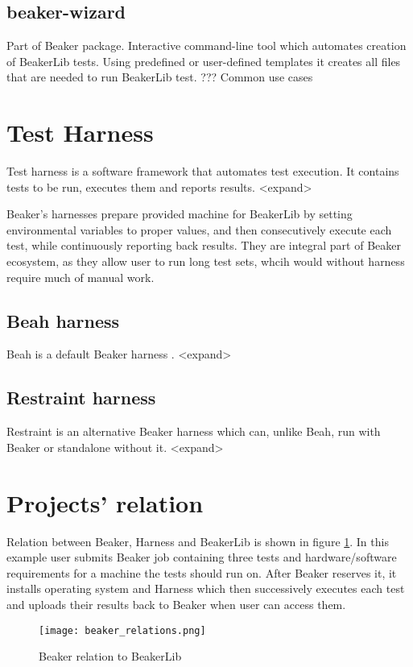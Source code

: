 \subsection{beaker-wizard}
Part of Beaker package. Interactive command-line tool which automates creation of BeakerLib tests. Using predefined or user-defined templates it creates all files that are needed to run BeakerLib test. 
???  Common use cases

\section{Test Harness}
Test harness is a software framework that automates test execution. It contains tests to be run, executes them and reports results. <expand>

Beaker’s harnesses prepare provided machine for BeakerLib by setting environmental variables to proper values, and then consecutively execute each test, while continuously reporting back results. They are integral part of Beaker ecosystem, as they allow user to run long test sets, whcih would without harness require much of manual work.

\subsection{Beah harness}
Beah \cite{beah_doc} is a default Beaker harness . <expand> 

\subsection{Restraint harness}
Restraint \cite{restraint_doc} is an alternative Beaker harness which can, unlike Beah, run with Beaker or standalone without it. <expand>

\section{Projects' relation}
Relation between Beaker, Harness and BeakerLib is shown in figure \ref{fig:beaker_relation}. In this example user submits Beaker job containing three tests and hardware/software requirements for a machine the tests should run on. After Beaker reserves it, it installs operating system and Harness which then successively executes each test and uploads their results back to Beaker when user can access them.

\begin{figure}[h!]
  \texttt{[image: beaker\_relations.png]}
  \caption{Beaker relation to BeakerLib}
  \label{fig:beaker_relation}
\end{figure}

